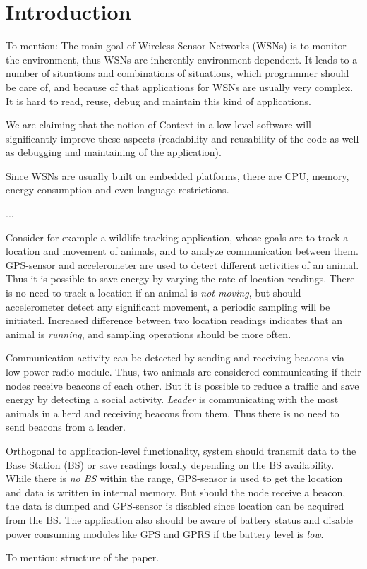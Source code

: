 \section{Introduction}
To mention: The main goal of Wireless Sensor Networks (WSNs) is to monitor the environment, thus WSNs are inherently environment dependent. It leads to a number of situations and combinations of situations, which programmer should be care of, and because of that applications for WSNs are usually very complex. It is hard to read, reuse, debug and maintain this kind of applications.

We are claiming that the notion of Context in a low-level software will significantly improve these aspects (readability and reusability of the code as well as debugging and maintaining of the application).

Since WSNs are usually built on embedded platforms, there are CPU, memory, energy consumption and even language restrictions.

...

Consider for example a wildlife tracking application\cite{pasztor10}, whose goals are to track a location and movement of animals, and to analyze communication between them.  GPS-sensor and accelerometer are used to detect different activities of an animal. Thus it is possible to save energy by varying the rate of location readings. There is no need to track a location if an animal is \emph{not moving}, but should accelerometer detect any significant movement, a periodic sampling will be initiated. Increased difference between two location readings indicates that an animal is \emph{running}, and sampling operations should be more often.

Communication activity can be detected by sending and receiving beacons via low-power radio module. Thus, two animals are considered communicating if their nodes receive beacons of each other. But it is possible to reduce a traffic and save energy by detecting a social activity. \emph{Leader} is communicating with the most animals in a herd and receiving beacons from them. Thus there is no need to send beacons from a leader.

Orthogonal to application-level functionality, system should transmit data to the Base Station (BS) or save readings locally depending on the BS availability. While there is \emph{no BS} within the range, GPS-sensor is used to get the location and data is written in internal memory. But should the node receive a beacon, the data is dumped and GPS-sensor is disabled since location can be acquired from the BS. The application also should be aware of battery status and disable power consuming modules like GPS and GPRS if the battery level is \emph{low}.

To mention: structure of the paper.